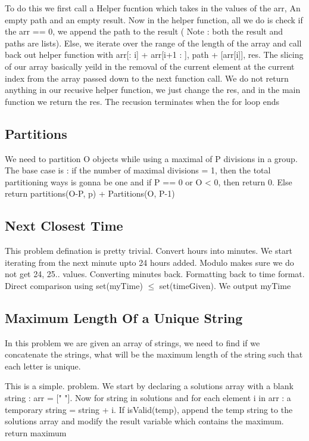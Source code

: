 \documentclass{article}
\newcommand{\nd}{\noindent}
\begin{document}
\nd To do this we first call a Helper fucntion which takes in the values of the arr, An empty path and an empty result. Now in the helper function, all we do is check if the arr == 0, we append the path to the result ( Note : both the result and paths are lists). Else, we iterate over the range of the length of the array and call back out helper function with arr[: i] + arr[i+1 : ], path + [arr[i]], res. The slicing of our array basically yeild in the removal of the current element at the current index from the array passed down to the next function call. We do not return anything in our recusive helper function, we just change the res, and in the main function we return the res. The recusion terminates when the for loop ends 

\subsection{Partitions}
We need to partition O objects while using a maximal of P divisions in a group. The base case is : if the number of maximal divisions = 1, then the total partitioning ways is gonna be one and if P == 0 or O < 0, then return 0. Else return partitions(O-P, p) + Partitions(O, P-1)

\subsection{Next Closest Time}
This problem defination is pretty trivial. Convert hours into minutes. We start iterating from the next minute upto 24 hours added. Modulo makes sure we do not get 24, 25.. values. Converting minutes back. Formatting back to time format. Direct comparison  using set(myTime) $\leq$ set(timeGiven). We output myTime

\subsection{Maximum Length Of a Unique String} 
In this problem we are given an array of strings, we need to find if we concatenate the strings, what will be the maximum length of the string such that each letter is unique. 

\nd This is a simple. problem. We start by declaring a solutions array with a blank string : arr = [" "]. Now for string in solutions and for each element i in arr : a temporary string = string + i. If isValid(temp), append the temp string to the solutions array and modify the result variable which contains the maximum. return maximum 
\end{document}
